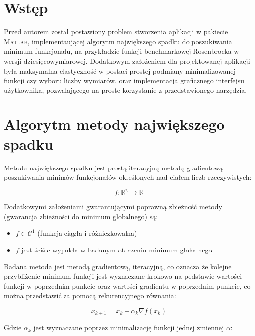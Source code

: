 \documentclass[12pt]{article}
\begin{document}
 


\section*{Wstęp}

Przed autorem został postawiony problem stworzenia aplikacji w pakiecie
\textsc{Matlab}, implementaującej algorytm największego spadku
do poszukiwania minimum funkcjonału, na przykładzie funkcji benchmarkowej
Rosenbrocka w wersji dziesięcowymiarowej.
Dodatkowym założeniem dla projektowanej aplikacji była maksymalna elastyczność w
postaci prostej podmiany minimalizowanej funkcji czy wyboru liczby wymiarów,
oraz implementacja graficznego interfejsu użytkownika, pozwalającego na proste
korzystanie z przedstawionego narzędzia.

\newpage

\section*{Algorytm metody największego spadku}

Metoda największego spadku jest prostą iteracyjną metodą gradientową
poszukiwania minimów funkcjonałów określonych nad ciałem liczb rzeczywistych:

\begin{equation*}
    f: \mathbb{R}^{n} \rightarrow \mathbb{R} 
\end{equation*}

Dodatkowymi założeniami gwarantującymi poprawną zbieżność metody (gwarancja
zbieżności do minimum globalnego) są:

\begin{itemize}
  \item $f \in \mathcal{C}^{1}$ (funkcja ciągła i różniczkowalna)
  \item $f$ jest ściśle wypukła w badanym otoczeniu minimum globalnego
\end{itemize}

Badana metoda jest metodą gradientową, iteracyjną, co oznacza że kolejne
przybliżenie minimum funkcji jest wyznaczane krokowo na podstawie wartości
funkcji w poprzednim punkcie oraz wartości gradientu w poprzednim punkcie, co
można przedstawić za pomocą rekurencyjnego równania:

\begin{equation}
    x_{k+1} = x_{k} - \alpha_{k} \nabla f(x_{k})
\end{equation}

Gdzie $\alpha_{k}$ jest wyznaczane poprzez minimalizację funkcji jednej
zmiennej $\alpha$:
\end{document}

